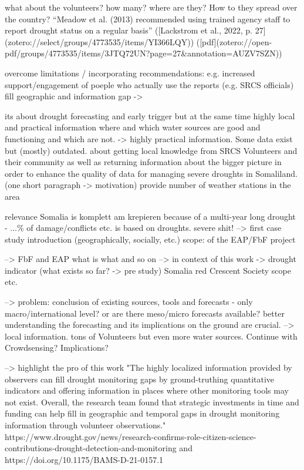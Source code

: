 what about the volunteers? how many? where are they? How to they spread over the country?
“Meadow et al. (2013) recommended using trained agency staff to report drought status on a regular basis” ([Lackstrom et al., 2022, p. 27](zotero://select/groups/4773535/items/YI366LQY)) ([pdf](zotero://open-pdf/groups/4773535/items/3JTQ72UN?page=27\&annotation=AUZV7SZN))

overcome limitations / incorporating recommendations: e.g. increased support/engagement of poeple who actually use the reports (e.g. SRCS officials) 
fill geographic and information gap ->

its about drought forecasting and early trigger but at the same time highly local and practical information where and which water sources are good and functioning and which are not. -> highly practical information. Some data exist but (mostly) outdated.
about getting local knowledge from SRCS Volunteers and their community as well as returning information about the bigger picture
in order to enhance the quality of data for managing severe droughts in Somaliland. (one short paragraph -> motivation)
provide number of weather stations in the area

relevance
Somalia is komplett am krepieren because of a multi-year long drought - ...\% of damage/conflicts etc. is based on droughts. severe shit! --> first case study introduction (geographically, socially, etc.) 
scope: of the EAP/FbF project

--> FbF and EAP what is what and so on --> in context of this work -> drought indicator (what exists so far? -> pre study)
Somalia red Crescent Society scope etc. 

--> problem: conclusion of existing sources, tools and forecasts - only macro/international level? or are there meso/micro forecasts available?
better understanding the forecasting and its implications on the ground are crucial. --> local information. tons of Volunteers but even more water sources. Continue with Crowdsensing? Implications?

--> highlight the pro of this work
"The highly localized information provided by observers can fill drought monitoring gaps by ground-truthing quantitative indicators and offering information in places where other monitoring tools may not exist. Overall, the research team found that strategic investments in time and funding can help fill in geographic and temporal gaps in drought monitoring information through volunteer observations."
https://www.drought.gov/news/research-confirms-role-citizen-science-contributions-drought-detection-and-monitoring and https://doi.org/10.1175/BAMS-D-21-0157.1

